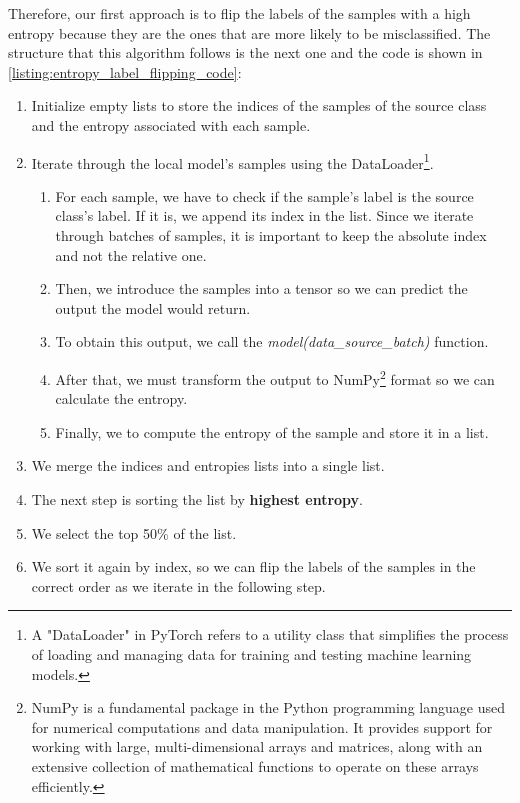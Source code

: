 Therefore, our first approach is to flip the labels of the samples with a high entropy because they are the ones that are more likely to be misclassified. The structure that this algorithm follows is the next one and the code is shown in \autoref{listing:entropy_label_flipping_code}:
\begin{enumerate}
        \item Initialize empty lists to store the indices of the samples of the source class and the entropy associated with each sample.
        \item Iterate through the local model's samples using the DataLoader\footnote{A "DataLoader" in PyTorch refers to a utility class that simplifies the process of loading and managing data for training and testing machine learning models.}.
                \begin{enumerate}
                        \item For each sample, we have to check if the sample's label is the source class's label. If it is, we append its index in the list. Since we iterate through batches of samples, it is important to keep the absolute index and not the relative one.
                        \item Then, we introduce the samples into a tensor so we can predict the output the model would return.
                        \item To obtain this output, we call the \textit{model(data\_source\_batch)} function.
                        \item After that, we must transform the output to NumPy\footnote{NumPy is a fundamental package in the Python programming language used for numerical computations and data manipulation. It provides support for working with large, multi-dimensional arrays and matrices, along with an extensive collection of mathematical functions to operate on these arrays efficiently.} format so we can calculate the entropy.
                        \item Finally, we to compute the entropy of the sample and store it in a list.
                \end{enumerate}
        \item We merge the indices and entropies lists into a single list.
        \item The next step is sorting the list by \textbf{highest entropy}.
        \item We select the top 50\% of the list.
        \item We sort it again by index, so we can flip the labels of the samples in the correct order as we iterate in the following step.

\end{enumerate}
